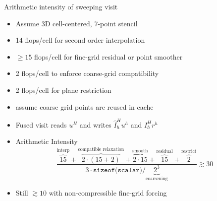\documentclass{beamer}
\begin{document}
\begin{frame}{Arithmetic intensity of sweeping visit}
  \begin{itemize}
  \item Assume 3D cell-centered, 7-point stencil
  \item 14 flops/cell for second order interpolation
  \item $\ge 15$ flops/cell for fine-grid residual or point smoother
  \item 2 flops/cell to enforce coarse-grid compatibility
  \item 2 flops/cell for plane restriction
  \item assume coarse grid points are reused in cache
  \item Fused visit reads $u^H$ and writes $\hat I_h^H u^h$ and $I_h^H r^h$
  \item Arithmetic Intensity
    \begin{equation}
      \frac{{\overbrace{15}^{\text{interp}}} + {\overbrace{2\cdot (15+2)}^{\text{compatible relaxation}}} + \overbrace{2\cdot 15}^{\text{smooth}} + \overbrace{15}^{\text{residual}} + \overbrace{2}^{\text{restrict}}}{3 \cdot \texttt{sizeof(scalar)} / \underbrace{2^3}_{\text{coarsening}}} \gtrsim 30
    \end{equation}
  \item Still $\gtrsim 10$ with non-compressible fine-grid forcing
  \end{itemize}
\end{frame}

\end{document}
